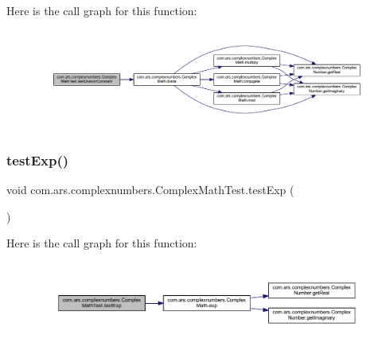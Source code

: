 Here is the call graph for this function\+:\nopagebreak
\begin{figure}[H]
\begin{center}
\leavevmode
\includegraphics[width=350pt]{classcom_1_1ars_1_1complexnumbers_1_1_complex_math_test_a7250df204110c40becd58a0886ec8e7c_cgraph}
\end{center}
\end{figure}
\hypertarget{classcom_1_1ars_1_1complexnumbers_1_1_complex_math_test_abd1ea731d0875c3351306079e4694c24}{}\label{classcom_1_1ars_1_1complexnumbers_1_1_complex_math_test_abd1ea731d0875c3351306079e4694c24} 
\subsubsection{\texorpdfstring{test\+Exp()}{testExp()}}
{\footnotesize\ttfamily void com.\+ars.\+complexnumbers.\+Complex\+Math\+Test.\+test\+Exp (\begin{DoxyParamCaption}{ }\end{DoxyParamCaption})}

Here is the call graph for this function\+:\nopagebreak
\begin{figure}[H]
\begin{center}
\leavevmode
\includegraphics[width=350pt]{classcom_1_1ars_1_1complexnumbers_1_1_complex_math_test_abd1ea731d0875c3351306079e4694c24_cgraph}
\end{center}
\end{figure}
\hypertarget{classcom_1_1ars_1_1complexnumbers_1_1_complex_math_test_a2102465aa80b8303b2de77a3e87ffea9}{}\label{classcom_1_1ars_1_1complexnumbers_1_1_complex_math_test_a2102465aa80b8303b2de77a3e87ffea9} 

